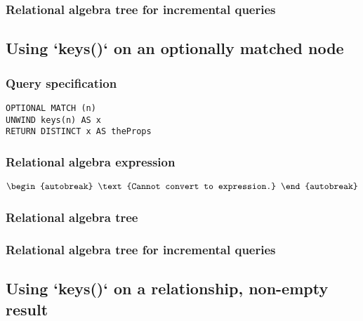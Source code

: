 
\subsubsection*{Relational algebra tree for incremental queries}


\subsection{Using `keys()` on an optionally matched node}

\subsubsection*{Query specification}

\begin{lstlisting}
OPTIONAL MATCH (n)
UNWIND keys(n) AS x
RETURN DISTINCT x AS theProps
\end{lstlisting}

\subsubsection*{Relational algebra expression}

\begin{align*}
\begin{autobreak}
\text{Cannot convert to expression.}
\end{autobreak}
\end{align*}

\subsubsection*{Relational algebra tree}


\subsubsection*{Relational algebra tree for incremental queries}


\subsection{Using `keys()` on a relationship, non-empty result}

